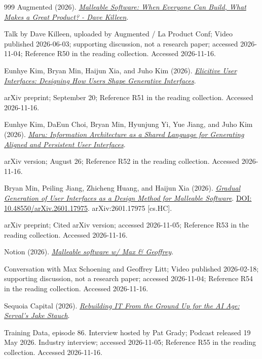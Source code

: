 \documentclass[11pt,letterpaper]{article}
\begin{document}
\begin{thebibliography}{999}
Augmented (2026).
\href{https://www.youtube.com/watch?v=iZ_hhezC1mA}{\emph{Malleable Software: When Everyone Can Build, What Makes a Great Product? - Dave Killeen}}.
\par {\small Talk by Dave Killeen, uploaded by Augmented / La Product Conf; Video published 2026-06-03; supporting discussion, not a research paper; accessed 2026-11-04; Reference R50 in the reading collection.}
{\small Accessed 2026-11-16.}

Eunhye Kim, Bryan Min, Haijun Xia, and Juho Kim (2026).
\href{https://arxiv.org/abs/2609.23642}{\emph{Elicitive User Interfaces: Designing How Users Shape Generative Interfaces}}.
\par {\small arXiv preprint; September 20; Reference R51 in the reading collection.}
{\small Accessed 2026-11-16.}

Eunhye Kim, DaEun Choi, Bryan Min, Hyunjung Yi, Yue Jiang, and Juho Kim (2026).
\href{https://arxiv.org/abs/2608.25565}{\emph{Maru: Information Architecture as a Shared Language for Generating Aligned and Persistent User Interfaces}}.
\par {\small arXiv version; August 26; Reference R52 in the reading collection.}
{\small Accessed 2026-11-16.}

Bryan Min, Peiling Jiang, Zhicheng Huang, and Haijun Xia (2026).
\href{https://arxiv.org/abs/2601.17975}{\emph{Gradual Generation of User Interfaces as a Design Method for Malleable Software}}.
\href{https://doi.org/10.48550/arXiv.2601.17975}{DOI: 10.48550/arXiv.2601.17975}.
arXiv:2601.17975 [cs.HC].
\par {\small arXiv preprint; Cited arXiv version; accessed 2026-11-05; Reference R53 in the reading collection.}
{\small Accessed 2026-11-16.}

Notion (2026).
\href{https://www.youtube.com/watch?v=vzlcK1IDBAM}{\emph{Malleable software w/ Max \& Geoffrey}}.
\par {\small Conversation with Max Schoening and Geoffrey Litt; Video published 2026-02-18; supporting discussion, not a research paper; accessed 2026-11-04; Reference R54 in the reading collection.}
{\small Accessed 2026-11-16.}

Sequoia Capital (2026).
\href{https://www.youtube.com/watch?v=j7ypvRUFY7M}{\emph{Rebuilding IT From the Ground Up for the AI Age: Serval's Jake Stauch}}.
\par {\small Training Data, episode 86. Interview hosted by Pat Grady; Podcast released 19 May 2026. Industry interview; accessed 2026-11-05; Reference R55 in the reading collection.}
{\small Accessed 2026-11-16.}


\end{thebibliography}
\end{document}
